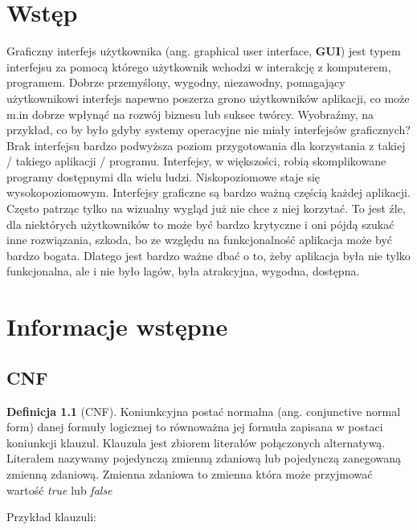 \documentclass[a4paper,12pt,oneside]{book}
\theoremstyle{definition}
\newtheorem{definition}{Definicja}
\begin{document}


\tableofcontents{}

\chapter*{Wstęp}

 Graficzny interfejs użytkownika (ang. graphical user interface, \textbf{GUI}) jest typem interfejsu za pomocą którego użytkownik wchodzi w interakcję z komputerem, programem. Dobrze przemyślony, wygodny, niezawodny, pomagający użytkownikowi interfejs napewno poszerza grono użytkowników aplikacji, co może m.in dobrze wpłynąć na rozwój biznesu lub suksec twórcy. Wyobraźmy, na przykład, co by było gdyby systemy operacyjne nie miały interfejsów graficznych? Brak interfejsu bardzo podwyższa poziom przygotowania dla korzystania z takiej / takiego aplikacji / programu. Interfejsy, w większości, robią skomplikowane programy dostępnymi dla wielu ludzi. Niskopoziomowe staje się wysokopoziomowym. Interfejsy graficzne są bardzo ważną częścią każdej aplikacji. Często patrząc tylko na wizualny wygląd już nie chce z niej korzytać. To jest źle, dla niektórych użytkowników to może być bardzo krytyczne i oni pójdą szukać inne rozwiązania, szkoda, bo ze względu na funkcjonalność aplikacja może być bardzo bogata. Dlatego jest bardzo ważne dbać o to, żeby aplikacja była nie tylko funkcjonalna, ale i nie było lagów, była atrakcyjna, wygodna, dostępna.

\chapter{Informacje wstępne}

\section{CNF}

\begin{definition}[CNF]
     Koniunkcyjna postać normalna (ang. conjunctive normal form) danej formuły logicznej to równoważna jej formuła zapisana w postaci koniunkcji klauzul. Klauzula jest zbiorem literałów połączonych alternatywą. Literałem nazywamy pojedynczą zmienną zdaniową lub pojedynczą zanegowaną zmienną zdaniową. Zmienna zdaniowa to zmienna która może przyjmować wartość \textit{true} lub \textit{false} 
\end{definition}

Przykład klauzuli:
\end{document}
